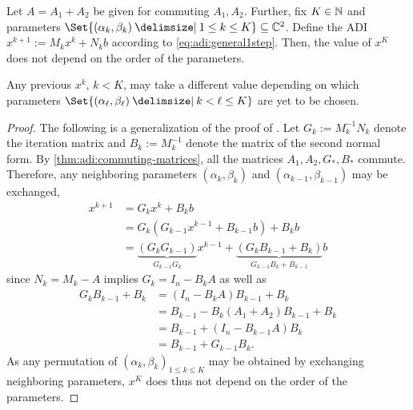 \begin{proposition}
\label{thm:adi:permutation}
  Let $A=A_1 + A_2$ be given for commuting $A_1,A_2$.
  Further, fix $K\in\mathbb{N}$ and parameters $\Set{(\alpha_k, \beta_k) \given 1 \leq k \leq K} \subseteq \C^2$.
  Define the \ac{ADI} $x^{k+1} := M_k x^k + N_k b$ according to \eqref{eq:adi:general1step}.
  Then, the value of $x^K$ does not depend on the order of the parameters.
\end{proposition}
\begin{remark}
  Any previous $x^k$, $k < K$, may take a different value depending on which parameters
  $\Set{(\alpha_\ell,\beta_\ell) \given k < \ell \leq K}$ are yet to be chosen.
\end{remark}
\begin{proof}
  The following is a generalization of the proof of \cite[Theorem~4.1]{Li2002}.
  Let $G_k := M_k^{-1} N_k$ denote the iteration matrix
  and $B_k := M_k^{-1}$ denote the matrix of the second normal form.
  By \autoref{thm:adi:commuting-matrices}, all the matrices $A_1, A_2, G_*, B_*$ commute.
  Therefore, any neighboring parameters $(\alpha_k,\beta_k)$ and $(\alpha_{k-1},\beta_{k-1})$ may be exchanged,
  \begin{align*}
    x^{k+1}
    &= G_k x^k + B_k b \\
    &= G_k (G_{k-1} x^{k-1} + B_{k-1} b) + B_k b \\
    &= \underbrace{
      (G_k G_{k-1})
    }_{
      G_{k-1} G_k
    } x^{k-1} + \underbrace{
      (G_k B_{k-1} + B_k)
    }_{
      G_{k-1} B_k + B_{k-1}
    } b
  \end{align*}
  since $N_k = M_k - A$ implies $G_k = I_n - B_k A$ as well as
  \begin{align*}
    G_k B_{k-1} + B_k
    &= (I_n - B_k A) B_{k-1} + B_k \\
    &= B_{k-1} - B_k (A_1+A_2) B_{k-1} + B_k \\
    &= B_{k-1} + (I_n - B_{k-1} A) B_k \\
    &= B_{k-1} + G_{k-1} B_k
    .
  \end{align*}
  As any permutation of $(\alpha_k,\beta_k)_{1\leq k \leq K}$ may be obtained by exchanging neighboring parameters,
  $x^K$ does thus not depend on the order of the parameters.
\end{proof}

